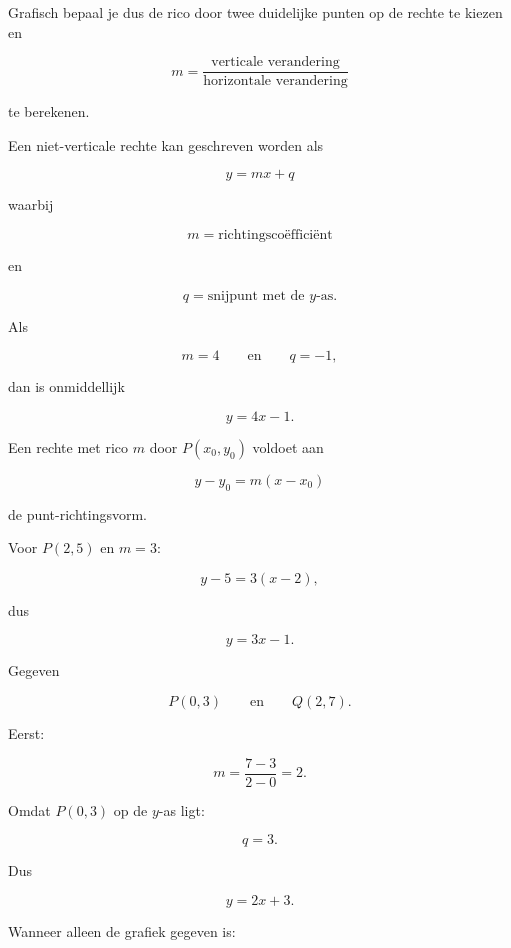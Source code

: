 \documentclass{ximera}
\begin{document}
Grafisch bepaal je dus de rico door twee duidelijke punten op de rechte te kiezen en

\[
m=\frac{\text{verticale verandering}}{\text{horizontale verandering}}
\]

te berekenen.



Een niet-verticale rechte kan geschreven worden als

\[
\boxed{y=mx+q}
\]

waarbij

\[
m=\text{richtingscoëfficiënt}
\]

en

\[
q=\text{snijpunt met de \(y\)-as}.
\]


\begin{voorbeeld}

Als

\[
m=4
\qquad\text{en}\qquad
q=-1,
\]

dan is onmiddellijk

\[
\boxed{y=4x-1}.
\]
\end{voorbeeld}


Een rechte met rico \(m\) door \(P(x_0,y_0)\) voldoet aan

\[
\boxed{
y-y_0=m(x-x_0)
}
\]

de punt-richtingsvorm.

\begin{voorbeeld}

Voor \(P(2,5)\) en \(m=3\):

\[
y-5=3(x-2),
\]

dus

\[
y=3x-1.
\]
\end{voorbeeld}


Gegeven

\[
P(0,3)
\qquad\text{en}\qquad
Q(2,7).
\]

Eerst:

\[
m=\frac{7-3}{2-0}=2.
\]

Omdat \(P(0,3)\) op de \(y\)-as ligt:

\[
q=3.
\]

Dus

\[
\boxed{y=2x+3}.
\]



Wanneer alleen de grafiek gegeven is:
\end{document}
